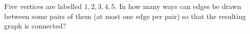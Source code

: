 Five vertices are labelled $1,2,3,4,5$. In how many ways can edges be drawn between some pairs of them (at most one edge per pair) so that the resulting graph is connected?
